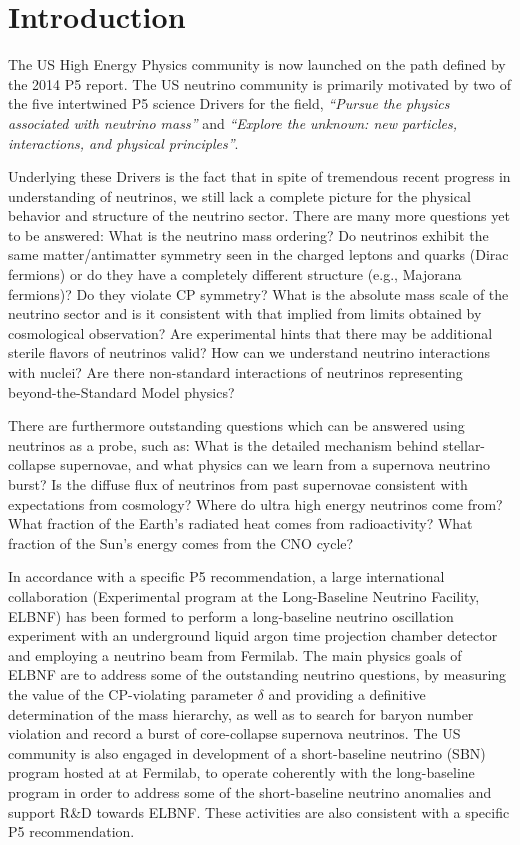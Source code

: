 \section{Introduction}
\label{sec:Introduction}


The US High Energy Physics community is now launched on the path defined by the 2014
P5 report.  The US neutrino community is primarily motivated by two of
the five intertwined P5 science Drivers for the field, 
\textit{``Pursue the physics associated with neutrino mass''} and
\textit{``Explore the unknown: new particles, interactions, and
  physical principles''}.  

Underlying these Drivers is the fact that in spite of tremendous
recent progress in understanding of neutrinos, we still lack a complete
picture for the physical behavior and structure of the
neutrino sector. There are many more questions yet to be answered:
What is the neutrino mass ordering? Do neutrinos exhibit the same
matter/antimatter symmetry seen in the charged leptons and quarks
(Dirac fermions) or do they have a completely different structure
(e.g., Majorana fermions)?  Do they violate CP symmetry?  What is the
absolute mass scale of the neutrino sector and is it consistent with
that implied from limits obtained by cosmological observation? Are
experimental hints that there may be additional sterile flavors of
neutrinos valid?  How can we understand neutrino interactions with
nuclei?  Are there non-standard interactions of neutrinos representing
beyond-the-Standard Model physics?  

There are furthermore outstanding questions which can be answered
using neutrinos as a probe, such as: What is the detailed mechanism
behind stellar-collapse supernovae, and what physics can we learn from
a supernova neutrino burst? Is the diffuse flux of neutrinos from past
supernovae consistent with expectations from cosmology?  Where do
ultra high energy neutrinos come from?  What fraction of the Earth's
radiated heat comes from radioactivity?  What fraction of the Sun's
energy comes from the CNO cycle?

In accordance with a specific P5 recommendation, a large international
collaboration (Experimental program at the Long-Baseline Neutrino
Facility, ELBNF) has been formed to perform a long-baseline neutrino
oscillation experiment with an underground liquid argon time
projection chamber detector and employing a neutrino beam from
Fermilab.  The main physics goals of ELBNF are to address some of the
outstanding neutrino questions, by measuring the value of
the CP-violating parameter $\delta$ and providing a definitive
determination of the mass hierarchy, as well as to search for baryon
number violation and record a burst of core-collapse supernova
neutrinos.  The US community is also engaged in development of a
short-baseline neutrino (SBN) program hosted at at Fermilab, to operate
coherently with the long-baseline program in order to address some of the 
short-baseline neutrino anomalies and support R\&D towards ELBNF. 
These activities are also consistent with a
specific P5 recommendation.

